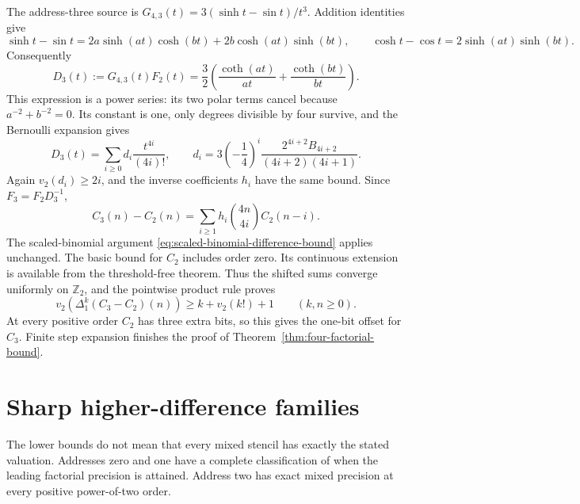 The address-three source is
$G_{4,3}(t)=3(\sinh t-\sin t)/t^3$. Addition identities give
\[
 \sinh t-\sin t
 =2a\sinh(at)\cosh(bt)+2b\cosh(at)\sinh(bt),
 \qquad \cosh t-\cos t=2\sinh(at)\sinh(bt).
\]
Consequently
\begin{equation}
 D_3(t):=G_{4,3}(t)F_2(t)
 =\frac32\left(\frac{\coth(at)}{at}
                            +\frac{\coth(bt)}{bt}\right).
 \label{eq:address-three-cotangent-factor}
\end{equation}
This expression is a power series: its two polar terms cancel because
$a^{-2}+b^{-2}=0$. Its constant is one, only degrees divisible by four
survive, and the Bernoulli expansion gives
\begin{equation}
 D_3(t)=\sum_{i\geq0}d_i\frac{t^{4i}}{(4i)!},\qquad
 d_i=3\left(-\frac14\right)^i
          \frac{2^{4i+2}B_{4i+2}}{(4i+2)(4i+1)}.
 \label{eq:address-three-packets}
\end{equation}
Again $v_2(d_i)\geq2i$, and the inverse coefficients $h_i$ have the same
bound. Since $F_3=F_2D_3^{-1}$,
\begin{equation}
 C_3(n)-C_2(n)=\sum_{i\geq1}h_i\binom{4n}{4i}C_2(n-i).
 \label{eq:address-three-exact-transfer}
\end{equation}
The scaled-binomial argument
\eqref{eq:scaled-binomial-difference-bound} applies unchanged.
The basic bound for $C_2$ includes order zero. Its continuous extension
is available from the threshold-free theorem. Thus the shifted sums
converge uniformly on $\mathbb Z_2$, and the pointwise product rule
proves
\begin{equation}
 v_2(\Delta_1^k(C_3-C_2)(n))\geq k+v_2(k!)+1
                                      \qquad(k,n\geq0).
 \label{eq:address-three-extra-bit}
\end{equation}
At every positive order $C_2$ has three extra bits, so this gives the
one-bit offset for $C_3$. Finite step expansion finishes the proof of
Theorem~\ref{thm:four-factorial-bound}.

\section{Sharp higher-difference families}
\label{sec:sharp-higher-final}

The lower bounds do not mean that every mixed stencil has exactly the
stated valuation. Addresses zero and one have a complete classification
of when the leading factorial precision is attained. Address two has
exact mixed precision at every positive power-of-two order.

